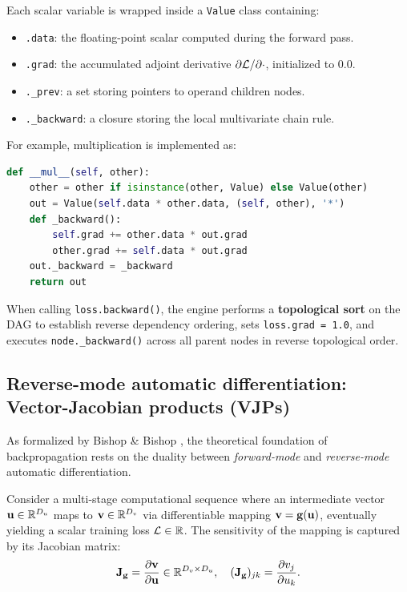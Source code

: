 \documentclass[../../main.tex]{subfiles}
\begin{document}
Each scalar variable is wrapped inside a \texttt{Value} class containing:
\begin{itemize}
    \item \texttt{.data}: the floating-point scalar computed during the forward pass.
    \item \texttt{.grad}: the accumulated adjoint derivative $\partial \mathcal{L} / \partial \cdot$, initialized to $0.0$.
    \item \texttt{.\_prev}: a set storing pointers to operand children nodes.
    \item \texttt{.\_backward}: a closure storing the local multivariate chain rule.
\end{itemize}
For example, multiplication is implemented as:
\begin{lstlisting}[language=Python]
def __mul__(self, other):
    other = other if isinstance(other, Value) else Value(other)
    out = Value(self.data * other.data, (self, other), '*')
    def _backward():
        self.grad += other.data * out.grad
        other.grad += self.data * out.grad
    out._backward = _backward
    return out
\end{lstlisting}
When calling \texttt{loss.backward()}, the engine performs a \textbf{topological sort} on the DAG to establish reverse dependency ordering, sets \texttt{loss.grad = 1.0}, and executes \texttt{node.\_backward()} across all parent nodes in reverse topological order.

\subsection{Reverse-mode automatic differentiation: Vector-Jacobian products (VJPs)}
\label{subsec:vjp_theory}
As formalized by Bishop \& Bishop \cite{bishop2024deep}, the theoretical foundation of backpropagation rests on the duality between \emph{forward-mode} and \emph{reverse-mode} automatic differentiation.

Consider a multi-stage computational sequence where an intermediate vector $\mathbf{u} \in \mathbb{R}^{D_u}$ maps to $\mathbf{v} \in \mathbb{R}^{D_v}$ via differentiable mapping $\mathbf{v} = \mathbf{g}(\mathbf{u})$, eventually yielding a scalar training loss $\mathcal{L} \in \mathbb{R}$. The sensitivity of the mapping is captured by its Jacobian matrix:
\begin{equation}
\label{eq:jacobian_def}
\mathbf{J}_{\mathbf{g}} = \frac{\partial \mathbf{v}}{\partial \mathbf{u}} \in \mathbb{R}^{D_v \times D_u}, \quad (\mathbf{J}_{\mathbf{g}})_{jk} = \frac{\partial v_j}{\partial u_k}.
\end{equation}
\end{document}
